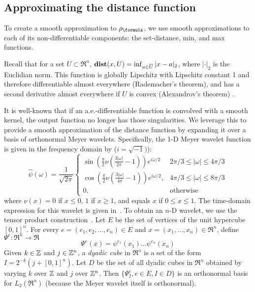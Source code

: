 \subsection{Approximating the distance function}
\label{sec:dist smoothing}
To create a smooth approximation to $\robf$, we use smooth approximations to each of its non-differentiable components: the set-distance, min, and max functions.

Recall that for a set $U \subset \Re^n$, $\mathbf{dist}(x,U) = \inf_{a \in \overline{U}} |x-a|_2$, where $|\cdot|_2$ is the Euclidian norm.
This function is globally Lipschitz with Lipschitz constant 1 and therefore differentiable almost everywhere (Rademacher's theorem), and has a second derivative almost everywhere if $U$ is convex (Alexandrov's theorem) \cite{MakelaN92book}.

It is well-known that if an a.e.-differentiable function is convolved with a smooth kernel, the output function no longer has those singularities.
We leverage this to provide a smooth approximation of the distance function by expanding it over a basis of orthonormal Meyer wavelets.
Specifically, the 1-D Meyer wavelet function is given in the frequency domain by ($i = \sqrt{-1})$):
\[\widehat{\psi}(\omega) = \frac{1}{\sqrt{2\pi}} \left \lbrace 
\begin{matrix} \sin (\frac{\pi}{2}\nu(\frac{3|\omega|}{2\pi}-1))e^{i\omega/2} & 2\pi/3 \leq |\omega| \leq 4\pi/3 \\
\cos (\frac{\pi}{2}\nu(\frac{3|\omega|}{4\pi}-1))e^{i\omega/2}, & 4\pi/3 \leq |\omega| \leq 8\pi/3\\
0, &\text{otherwise}\end{matrix} \right. \]
where $\nu(x) = 0$ if $x\leq 0$, $1$ if $x \geq 1$, and equals $x$ if $0\leq x \leq 1$.
The time-domain expression for this wavelet is given in~\cite{Valenzuela15}.
To obtain an $n$-D wavelet, we use the tensor product construction~\cite{MallatBook}.
Let $E$ be the set of vertices of the unit hypercube $[0,1]^n$.
For every $e = (e_1,e_2,\ldots,e_n) \in E$ and $x = (x_1,\ldots,x_n) \in \Re^n$, define $\Psi^e:\Re^n \rightarrow \Re$
\begin{equation*}
\label{eq:tensor meyer}
\Psi^e(x)= \psi^{e_1}(x_1)\ldots \psi^{e_n}(x_n)
\end{equation*}
Given $k \in \mathbb{Z}$ and $j \in \mathbb{Z}^n$, a \textit{dyadic cube} in $\Re^n$ is a set of the form $I = 2^{-k}(j + [0,1]^n)$.
Let $D$ be the set of all dyadic cubes in $\Re^n$ obtained by varying $k$ over $\mathbb{Z}$ and $j$ over $\mathbb{Z}^n$.
Then $\{\Psi^e_{I}, e \in E, I\in D\}$ is an orthonormal basis for $L_2(\Re^n)$ (because the Meyer wavelet itself is orthonormal).
